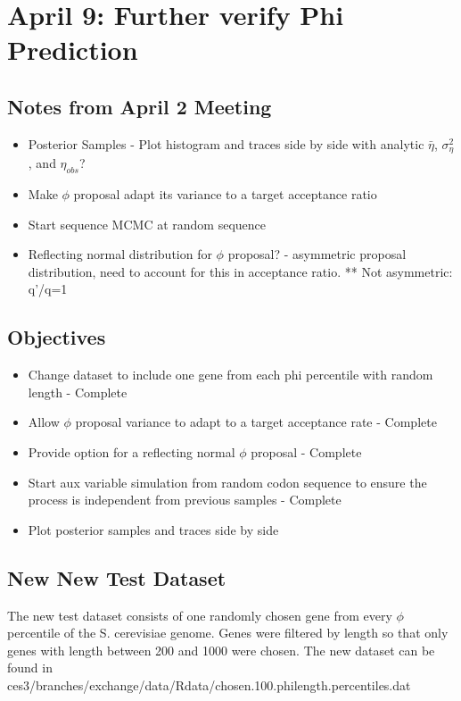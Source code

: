 \documentclass{article}
\begin{document}
 
\section{April 9: Further verify Phi Prediction}
 	\subsection{Notes from April 2 Meeting}
	\begin{itemize}
 		\item Posterior Samples - Plot histogram and traces side by side with analytic $\bar\eta$, $\sigma^2_\eta$, and $\eta_{obs}$?
 		\item Make $\phi$ proposal adapt its variance to a target acceptance ratio
 		\item Start sequence MCMC at random sequence
 		\item Reflecting normal distribution for $\phi$ proposal? - asymmetric proposal distribution, need to account for this in acceptance ratio. ** Not asymmetric: q'/q=1 
	\end{itemize}

	\subsection{Objectives}
	\begin{itemize}
	\item Change dataset to include one gene from each phi percentile with random length - Complete
	\item Allow $\phi$ proposal variance to adapt to a target acceptance rate - Complete
	\item Provide option for a reflecting normal $\phi$ proposal - Complete
	\item Start aux variable simulation from random codon sequence to ensure the process is independent from previous samples - Complete
	\item Plot posterior samples and traces side by side
	\end{itemize}
 	\subsection{New New Test Dataset}
 	The new test dataset consists of one randomly chosen gene from every $\phi$ percentile of the S. cerevisiae genome. Genes were filtered by length so that only genes with length between 200 and 1000 were chosen. The new dataset can be found in ces3/branches/exchange/data/Rdata/chosen.100.philength.percentiles.dat
\end{document}
